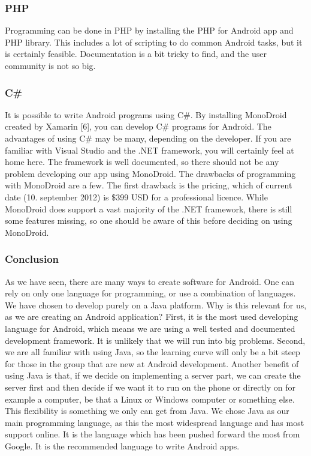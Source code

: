 \subsubsection{PHP}
Programming can be done in PHP by installing the PHP for Android app and PHP library. This includes a lot of scripting to do common Android tasks, but it is certainly feasible. Documentation is a bit tricky to find, and the user community is not so big.

\subsubsection{C\#}
It is possible to write Android programs using C\#. By installing MonoDroid created by Xamarin [6], you can develop C\# programs for Android. The advantages of using C\# may be many, depending on the developer. If you are familiar with Visual Studio and the .NET framework, you will certainly feel at home here. The framework is well documented, so there should not be any problem developing our app using MonoDroid.
\newline
\newline
The drawbacks of programming with MonoDroid are a few. The first drawback is the pricing, which of current date (10. september 2012) is \$399 USD for a professional licence. While MonoDroid does support a vast majority of the .NET framework, there is still some features missing, so one should be aware of this before deciding on using MonoDroid.

\subsubsection{Conclusion}
As we have seen, there are many ways to create software for Android. One can rely on only one language for programming, or use a combination of languages. We have chosen to develop purely on a Java platform. Why is this relevant for us, as we are creating an Android application?
\newline
\newline
First, it is the most used developing language for Android, which means we are using a well tested and documented development framework. It is unlikely that we will run into big problems. Second, we are all familiar with using Java, so the learning curve will only be a bit steep for those in the group that are new at Android development.  Another benefit of using Java is that, if we decide on implementing a server part, we can create the server first and then decide if we want it to run on the phone or directly on for example a computer, be that a Linux or Windows computer or something else. This flexibility is something we only can get from Java.
\newline
\newline
We chose Java as our main programming language, as this the most widespread language and has most support online. It is the language which has been pushed forward the most from Google. It is the recommended language to write Android apps.






